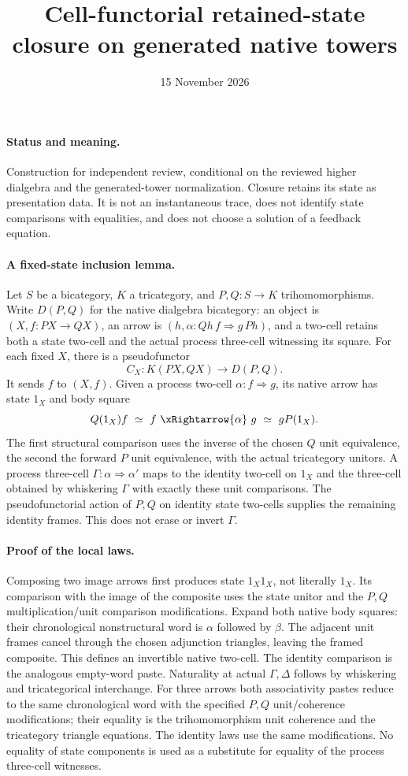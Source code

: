 \documentclass{article}
\title{Cell-functorial retained-state closure on generated native towers}
\date{15 November 2026}
\begin{document}
\maketitle
\paragraph{Status and meaning.} Construction for independent review, conditional on the reviewed higher dialgebra and the generated-tower normalization. Closure retains its state as presentation data. It is not an instantaneous trace, does not identify state comparisons with equalities, and does not choose a solution of a feedback equation.

\paragraph{A fixed-state inclusion lemma.} Let $S$ be a bicategory, $K$ a tricategory, and $P,Q:S\to K$ trihomomorphisms. Write $D(P,Q)$ for the native dialgebra bicategory: an object is $(X,f:PX\to QX)$, an arrow is $(h,\alpha:Qh\,f\Rightarrow g\,Ph)$, and a two-cell retains both a state two-cell and the actual process three-cell witnessing its square. For each fixed $X$, there is a pseudofunctor
\[
 C_X:K(PX,QX)\longrightarrow D(P,Q).
\]
It sends $f$ to $(X,f)$. Given a process two-cell $\alpha:f\Rightarrow g$, its native arrow has state $1_X$ and body square
\[
 Q(1_X)f\ \simeq\ f\ \xRightarrow{\alpha}\ g\ \simeq\ gP(1_X).
\]
The first structural comparison uses the inverse of the chosen $Q$ unit equivalence, the second the forward $P$ unit equivalence, with the actual tricategory unitors. A process three-cell $\Gamma:\alpha\Rightarrow\alpha'$ maps to the identity two-cell on $1_X$ and the three-cell obtained by whiskering $\Gamma$ with exactly these unit comparisons. The pseudofunctorial action of $P,Q$ on identity state two-cells supplies the remaining identity frames. This does not erase or invert $\Gamma$.

\paragraph{Proof of the local laws.} Composing two image arrows first produces state $1_X1_X$, not literally $1_X$. Its comparison with the image of the composite uses the state unitor and the $P,Q$ multiplication/unit comparison modifications. Expand both native body squares: their chronological nonstructural word is $\alpha$ followed by $\beta$. The adjacent unit frames cancel through the chosen adjunction triangles, leaving the framed composite. This defines an invertible native two-cell. The identity comparison is the analogous empty-word paste. Naturality at actual $\Gamma,\Delta$ follows by whiskering and tricategorical interchange. For three arrows both associativity pastes reduce to the same chronological word with the specified $P,Q$ unit/coherence modifications; their equality is the trihomomorphism unit coherence and the tricategory triangle equations. The identity laws use the same modifications. No equality of state components is used as a substitute for equality of the process three-cell witnesses.
\end{document}
